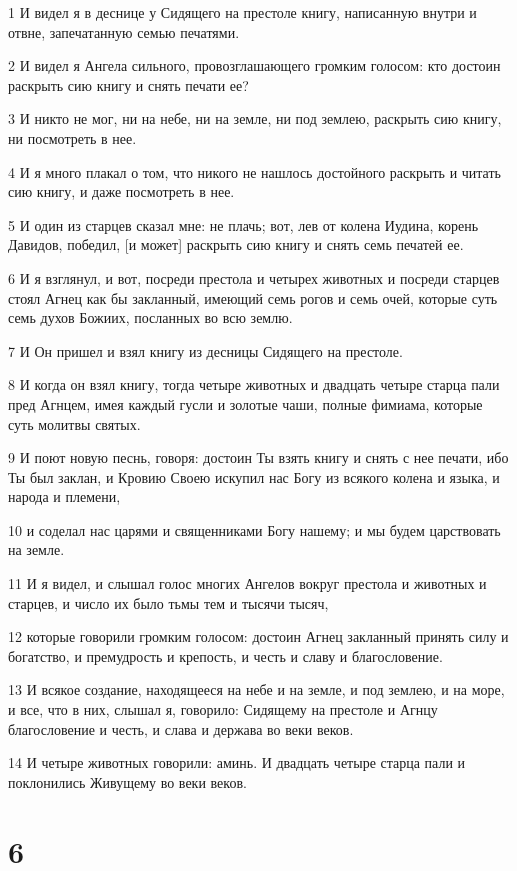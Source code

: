 \par 1 И видел я в деснице у Сидящего на престоле книгу, написанную внутри и отвне, запечатанную семью печатями.
\par 2 И видел я Ангела сильного, провозглашающего громким голосом: кто достоин раскрыть сию книгу и снять печати ее?
\par 3 И никто не мог, ни на небе, ни на земле, ни под землею, раскрыть сию книгу, ни посмотреть в нее.
\par 4 И я много плакал о том, что никого не нашлось достойного раскрыть и читать сию книгу, и даже посмотреть в нее.
\par 5 И один из старцев сказал мне: не плачь; вот, лев от колена Иудина, корень Давидов, победил, [и может] раскрыть сию книгу и снять семь печатей ее.
\par 6 И я взглянул, и вот, посреди престола и четырех животных и посреди старцев стоял Агнец как бы закланный, имеющий семь рогов и семь очей, которые суть семь духов Божиих, посланных во всю землю.
\par 7 И Он пришел и взял книгу из десницы Сидящего на престоле.
\par 8 И когда он взял книгу, тогда четыре животных и двадцать четыре старца пали пред Агнцем, имея каждый гусли и золотые чаши, полные фимиама, которые суть молитвы святых.
\par 9 И поют новую песнь, говоря: достоин Ты взять книгу и снять с нее печати, ибо Ты был заклан, и Кровию Своею искупил нас Богу из всякого колена и языка, и народа и племени,
\par 10 и соделал нас царями и священниками Богу нашему; и мы будем царствовать на земле.
\par 11 И я видел, и слышал голос многих Ангелов вокруг престола и животных и старцев, и число их было тьмы тем и тысячи тысяч,
\par 12 которые говорили громким голосом: достоин Агнец закланный принять силу и богатство, и премудрость и крепость, и честь и славу и благословение.
\par 13 И всякое создание, находящееся на небе и на земле, и под землею, и на море, и все, что в них, слышал я, говорило: Сидящему на престоле и Агнцу благословение и честь, и слава и держава во веки веков.
\par 14 И четыре животных говорили: аминь. И двадцать четыре старца пали и поклонились Живущему во веки веков.

\chapter{6}

